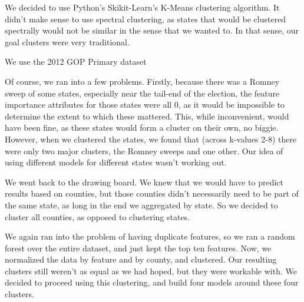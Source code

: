 \documentclass{article}
\begin{document}
We decided to use Python's Skikit-Learn's K-Means clustering algorithm. It didn't make sense to use spectral clustering, as states that would be clustered spectrally would not be similar in the sense that we wanted to. In that sense, our goal clusters were very traditional. 


\par




We use the 2012 GOP Primary dataset 


Of course, we ran into a few problems. Firstly, because there was a Romney sweep of some states, especially near the tail-end of the election, the feature importance attributes for those states were all 0, as it would be impossible to determine the extent to which these mattered.
This, while inconvenient, would have been fine, as these states would form a cluster on their own, no biggie. However, when we clustered the states, we found that (across k-values 2-8) there were only two major clusters, the Romney sweeps and one other. Our idea of using different models for different states wasn't working out.\par
We went back to the drawing board. We knew that we would have to predict results based on counties, but those counties didn't necessarily need to be part of the same state, as long in the end we aggregated by state. So we decided to cluster all counties, as opposed to clustering states.\par
We again ran into the problem of having duplicate features, so we ran a random forest over the entire dataset, and just kept the top ten features. Now, we normalized the data by feature and by county, and clustered. Our resulting clusters still weren't as equal as we had hoped, but they were workable with. We decided to proceed using this clustering, and build four models around these four clusters.  
\end{document}
